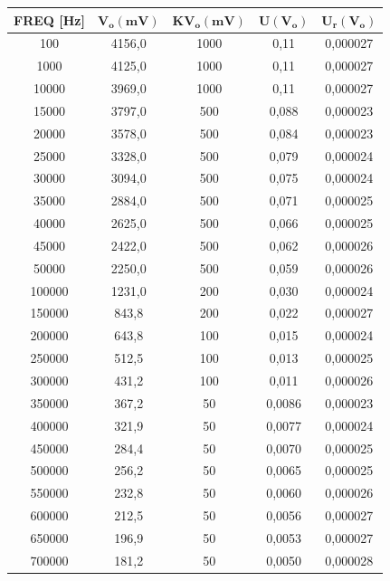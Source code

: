 \begin{table}[!ht]
    \centering
    \begin{tabular}{|c|c|c|c|c|}
    \hline

        \textbf{FREQ [Hz]} & $\bm{V_o(mV)}$ & $\bm{KV_o(mV)}$ & $\bm{U(V_o)}$ & $\bm{U_r(V_o)}$  \\ \hline

      
        100 & 4156,0 & 1000 & 0,11 & 0,000027 \\ \hline
        1000 & 4125,0 & 1000 & 0,11 & 0,000027 \\ \hline
        10000 & 3969,0 & 1000 & 0,11 & 0,000027 \\ \hline
        15000 & 3797,0 & 500 & 0,088 & 0,000023 \\ \hline
        20000 & 3578,0 & 500 & 0,084 & 0,000023 \\ \hline
        25000 & 3328,0 & 500 & 0,079 & 0,000024 \\ \hline
        30000 & 3094,0 & 500 & 0,075 & 0,000024 \\ \hline
        35000 & 2884,0 & 500 & 0,071 & 0,000025 \\ \hline
        40000 & 2625,0 & 500 & 0,066 & 0,000025 \\ \hline
        45000 & 2422,0 & 500 & 0,062 & 0,000026 \\ \hline
        50000 & 2250,0 & 500 & 0,059 & 0,000026 \\ \hline
        100000 & 1231,0 & 200 & 0,030 & 0,000024 \\ \hline
        150000 & 843,8 & 200 & 0,022 & 0,000027 \\ \hline
        200000 & 643,8 & 100 & 0,015 & 0,000024 \\ \hline
        250000 & 512,5 & 100 & 0,013 & 0,000025 \\ \hline
        300000 & 431,2 & 100 & 0,011 & 0,000026 \\ \hline
        350000 & 367,2 & 50 & 0,0086 & 0,000023 \\ \hline
        400000 & 321,9 & 50 & 0,0077 & 0,000024 \\ \hline
        450000 & 284,4 & 50 & 0,0070 & 0,000025 \\ \hline
        500000 & 256,2 & 50 & 0,0065 & 0,000025 \\ \hline
        550000 & 232,8 & 50 & 0,0060 & 0,000026 \\ \hline
        600000 & 212,5 & 50 & 0,0056 & 0,000027 \\ \hline
        650000 & 196,9 & 50 & 0,0053 & 0,000027 \\ \hline
        700000 & 181,2 & 50 & 0,0050 & 0,000028 \\ \hline									
        
    \end{tabular}
\end{table}

